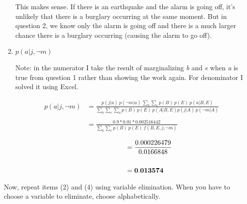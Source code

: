 \documentclass[fleqn]{hw}
\begin{document}
\begin{enumerate}
This makes sense. If there is an earthquake and the alarm is going off, it's unlikely that there is a burglary occurring at the same moment. But in question 2, we know only the alarm is going off and there is a much larger chance there is a burglary occurring (causing the alarm to go off).

\item $p(a | j,\lnot m)$

Note: in the numerator I take the result of marginalizing {\it b} and {\it e} when {\it a} is true from question 1 rather than showing the work again. For denominator I solved it using Excel.

\begin{align*}
p(a | j, \lnot m) & = \frac{p(j | a) \ p(\lnot m | a) \ \sum_{b} \sum_{e} p(B) \ p(E) \ p(a | B, E)}{\sum_{b} \sum_{e} \sum_{a} p(B) \ p(E) \ p(A | B, E) p(j | A) \ p(\lnot m | A)} \\ \\ 
&= \frac{0.9 * 0.01 * 0.002516442}{\sum_{b} \sum_{e} p(B) \ p(E) \ f(B, E, j, \lnot m)}
\end{align*}

\begin{align*}
\qquad \qquad \quad &= \frac{0.000226479}{0.0166848} \\ \\
&= {\bf 0.013574}
\end{align*}


\end{enumerate}

Now, repeat items (2) and (4) using variable elimination.  When you
have to choose a variable to eliminate, choose alphabetically.
\end{document}
